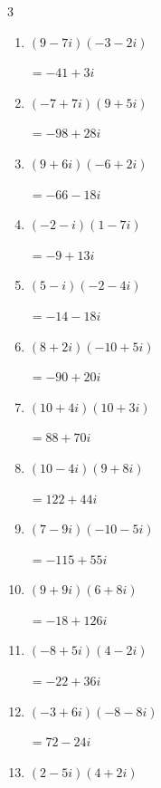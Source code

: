 \begin{multicols}{3}
\begin{enumerate}
        $\displaystyle =109i$

  \item $\displaystyle (9-7i)(-3-2i)$

        $\displaystyle =-41+3i$

  \item $\displaystyle (-7+7i)(9+5i)$

        $\displaystyle =-98+28i$

  \item $\displaystyle (9+6i)(-6+2i)$

        $\displaystyle =-66-18i$

  \item $\displaystyle (-2-i)(1-7i)$

        $\displaystyle =-9+13i$

  \item $\displaystyle (5-i)(-2-4i)$

        $\displaystyle =-14-18i$

  \item $\displaystyle (8+2i)(-10+5i)$

        $\displaystyle =-90+20i$

  \item $\displaystyle (10+4i)(10+3i)$

        $\displaystyle =88+70i$

  \item $\displaystyle (10-4i)(9+8i)$

        $\displaystyle =122+44i$

\columnbreak %

\resetques

  \item $\displaystyle (7-9i)(-10-5i)$

        $\displaystyle =-115+55i$

  \item $\displaystyle (9+9i)(6+8i)$

        $\displaystyle =-18+126i$

  \item $\displaystyle (-8+5i)(4-2i)$

        $\displaystyle =-22+36i$

  \item $\displaystyle (-3+6i)(-8-8i)$

        $\displaystyle =72-24i$

  \item $\displaystyle (2-5i)(4+2i)$


\end{enumerate}
\end{multicols}
